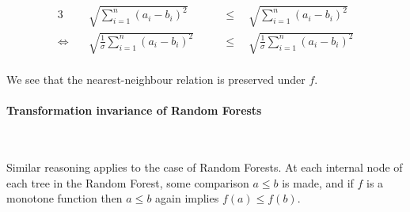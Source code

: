 \begin{alignat*}{3}
  &\sqrt{\sum_{i = 1}^n \left(a_i - b_i\right)^2} &&\quad \leq\quad  \sqrt{\sum_{i = 1}^n
  \left(a_i - b_i\right)^2}\\[4pt]
  \Leftrightarrow\quad  &\sqrt{\frac{1}{\sigma}\sum_{i = 1}^n \left(a_i -
  b_i\right)^2} &&\quad \leq\quad  \sqrt{\frac{1}{\sigma}\sum_{i = 1}^n \left(a_i - b_i\right)^2}
  \\[4pt]
\end{alignat*}

We see that the nearest-neighbour relation is preserved under $f$.


\paragraph{Transformation invariance of Random Forests}~\smallskip

Similar reasoning applies to the case of Random Forests. At each internal node
of each tree in the Random Forest, some comparison $a \leq b$ is made, and if
$f$ is a monotone function then $a \leq b$ again implies $f(a) \leq f(b)$.

\sectend
